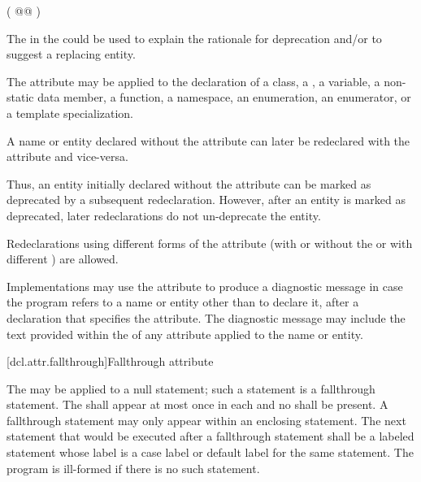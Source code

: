 \begin{codeblock}
( @@ )
\end{codeblock}
\begin{note} The  in the 
could be used to explain the rationale for deprecation and/or to suggest a replacing entity.
\end{note}

\pnum
The attribute may be applied to the declaration of
a class,
a ,
a variable,
a non-static data member,
a function,
a namespace,
an enumeration,
an enumerator, or
a template specialization.

\pnum
A name or entity declared without the  attribute can later be redeclared
with the attribute and vice-versa. \begin{note} Thus, an entity initially declared without the
attribute can be marked as deprecated by a subsequent redeclaration. However, after an entity
is marked as deprecated, later redeclarations do not un-deprecate the entity. \end{note}
Redeclarations using different forms of the attribute (with or without the
 or with different
) are allowed.

\pnum
\begin{note} Implementations may use the  attribute to produce a diagnostic
message in case the program refers to a name or entity other than to declare it, after a
declaration that specifies the attribute. The diagnostic message may include the text provided
within the  of any  attribute applied
to the name or entity. \end{note}

[dcl.attr.fallthrough]{Fallthrough attribute}

\pnum
The  
may be applied to a null statement;
such a statement is a fallthrough statement.
The  
shall appear at most once in each  and
no  shall be present.
A fallthrough statement may only appear within
an enclosing  statement.
The next statement that would be executed after a fallthrough statement
shall be a labeled statement whose label is a case label or
default label for the same  statement.
The program is ill-formed if there is no such statement.

